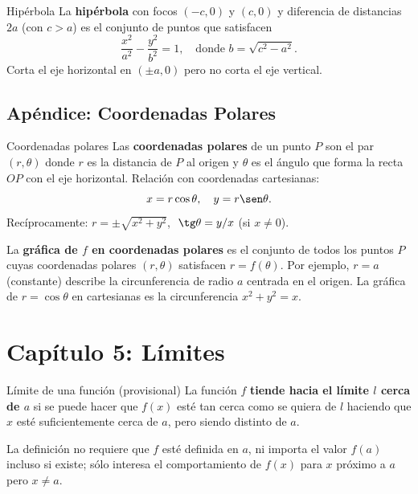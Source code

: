 \documentclass[12pt]{article}
\begin{document}
\begin{definicion}[]{Hipérbola}
La \textbf{hipérbola} con focos $(-c, 0)$ y $(c, 0)$ y diferencia de distancias $2a$ (con $c > a$) es el conjunto de puntos que satisfacen
\[ \frac{x^2}{a^2} - \frac{y^2}{b^2} = 1, \quad \text{donde } b = \sqrt{c^2 - a^2}. \]
Corta el eje horizontal en $(\pm a, 0)$ pero no corta el eje vertical.
\end{definicion}

\subsection{Apéndice: Coordenadas Polares}

\begin{definicion}[]{Coordenadas polares}
Las \textbf{coordenadas polares} de un punto $P$ son el par $(r, \theta)$ donde $r$ es la distancia de $P$ al origen y $\theta$ es el ángulo que forma la recta $OP$ con el eje horizontal. Relación con coordenadas cartesianas:
\[ x = r\cos\theta, \quad y = r\sen\theta. \]
Recíprocamente: $r = \pm\sqrt{x^2 + y^2}$, $\;\tg\theta = y/x$ (si $x \neq 0$).
\end{definicion}

\begin{nota}[]{}
La \textbf{gráfica de $f$ en coordenadas polares} es el conjunto de todos los puntos $P$ cuyas coordenadas polares $(r, \theta)$ satisfacen $r = f(\theta)$. Por ejemplo, $r = a$ (constante) describe la circunferencia de radio $a$ centrada en el origen. La gráfica de $r = \cos\theta$ en cartesianas es la circunferencia $x^2 + y^2 = x$.
\end{nota}

\section{Capítulo 5: Límites}

\begin{definicion}[]{Límite de una función (provisional)}
La función $f$ \textbf{tiende hacia el límite $l$ cerca de $a$} si se puede hacer que $f(x)$ esté tan cerca como se quiera de $l$ haciendo que $x$ esté suficientemente cerca de $a$, pero siendo distinto de $a$.
\end{definicion}

\begin{nota}[]{}
La definición no requiere que $f$ esté definida en $a$, ni importa el valor $f(a)$ incluso si existe; sólo interesa el comportamiento de $f(x)$ para $x$ próximo a $a$ pero $x \neq a$.
\end{nota}
\end{document}
